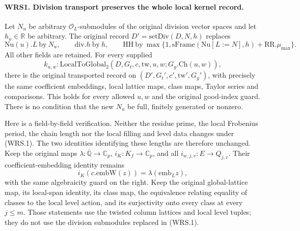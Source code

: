 \paragraph{WRS1. Division transport preserves the whole local kernel record.}
\label{claim:WRS1}
Let \(N_u\) be arbitrary \(\mathcal O_L\)-submodules of the original
division vector spaces and let \(h_u\in\mathbb R\) be arbitrary.
The original record
\(D'=\mathrm{setDiv}(D,N,h)\) replaces
\[
 \mathrm{Nu}(u).L\ \text{by}\ N_u,\qquad
 \mathrm{div}.h\ \text{by}\ h,\qquad
 \mathrm{HH}\ \text{by}\
 \max\{1,\mathrm{sFrame}(\mathrm{Nu}[L:=N],h)+\mathrm{RR}.\mu_{\max}\}.
 \tag{WRS.1}
\]
All other fields are retained.  For every supplied
\[
 k_{u,w}:\mathrm{LocalToGlobal}_2
       (D,G_t,c,\mathrm{tw},u,w;G_y.\mathrm{Ch}(u,w)),
\]
there is the original transported record on
\((D',G_t',c',\mathrm{tw}',G_y')\), with precisely the same
coefficient embeddings, local lattice maps, class maps, Taylor series
and comparisons.  This holds for every allowed \(u,w\) and the
original good-index guard.  There is no condition that the new
\(N_u\) be full, finitely generated or nonzero.

Here is a field-by-field verification.  Neither the residue prime, the
local Frobenius period, the chain length nor the local filling and level
data changes under (WRS.1).  The two identities identifying these
lengths are therefore unchanged.  Keep the original maps
\(\lambda:\overline{\mathbb Q}\to\mathbb C_p\),
\(i_K:K_f\to\mathbb C_p\), and all
\(i_{w,j,v}:E\to Q_{j,v}\).
Their coefficient-embedding identity remains
\[
 i_K(c.\mathrm{embW}(z))=\lambda(\mathrm{emb}_L z),
 \tag{WRS.2}
\]
with the same algebraicity guard on the right.
Keep the original global-lattice map, its local-span identity, its
class map, the equivalence relating equality of classes to the local
level action, and its surjectivity onto every class at every
\(j\le m\).  Those statements use the twisted column lattices and
local level tuples; they do not use the division submodules replaced
in (WRS.1).

